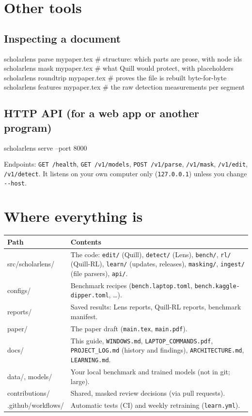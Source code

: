 \documentclass[11pt]{article}
\newcommand{\cm}[1]{\texttt{#1}}
\begin{document}
\section{Other tools}

\subsection*{Inspecting a document}
\begin{cmd}
scholarlens parse mypaper.tex       # structure: which parts are prose, with node ids
scholarlens mask mypaper.tex        # what Quill would protect, with placeholders
scholarlens roundtrip mypaper.tex   # proves the file is rebuilt byte-for-byte
scholarlens features mypaper.tex    # the raw detection measurements per segment
\end{cmd}

\subsection*{HTTP API (for a web app or another program)}
\begin{cmd}
scholarlens serve --port 8000
\end{cmd}
Endpoints: \cm{GET /health}, \cm{GET /v1/models}, \cm{POST /v1/parse}, \cm{/v1/mask}, \cm{/v1/edit}, \cm{/v1/detect}. It listens on your own computer only (\cm{127.0.0.1}) unless you change \cm{-{}-host}.

\section{Where everything is}

\begin{tabularx}{\linewidth}{@{}>{\ttfamily}l X@{}}
\toprule
\normalfont Path & Contents \\
\midrule
src/scholarlens/ & The code: \cm{edit/} (Quill), \cm{detect/} (Lens), \cm{bench/}, \cm{rl/} (Quill-RL), \cm{learn/} (updates, releases), \cm{masking/}, \cm{ingest/} (file parsers), \cm{api/}. \\
configs/ & Benchmark recipes (\cm{bench.laptop.toml}, \cm{bench.kaggle-dipper.toml}, \ldots). \\
reports/ & Saved results: Lens reports, Quill-RL reports, benchmark manifest. \\
paper/ & The paper draft (\cm{main.tex}, \cm{main.pdf}). \\
docs/ & This guide, \cm{WINDOWS.md}, \cm{LAPTOP\_COMMANDS.pdf}, \cm{PROJECT\_LOG.md} (history and findings), \cm{ARCHITECTURE.md}, \cm{LEARNING.md}. \\
data/, models/ & Your local benchmark and trained models (not in git; large). \\
contributions/ & Shared, masked review decisions (via pull requests). \\
.github/workflows/ & Automatic tests (CI) and weekly retraining (\cm{learn.yml}). \\
\bottomrule
\end{tabularx}
\end{document}
